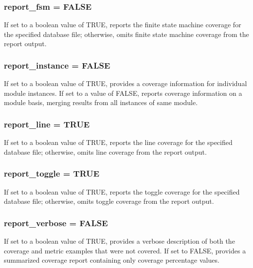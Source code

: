 \subsubsection{ report\_\-fsm = FALSE}\label{report_8c_a3}


If set to a boolean value of TRUE, reports the finite state machine coverage for the specified database file; otherwise, omits finite state machine coverage from the report output. 
\subsubsection{ report\_\-instance = FALSE}\label{report_8c_a5}


If set to a boolean value of TRUE, provides a coverage information for individual module instances. If set to a value of FALSE, reports coverage information on a module basis, merging results from all instances of same module. 
\subsubsection{ report\_\-line = TRUE}\label{report_8c_a0}


If set to a boolean value of TRUE, reports the line coverage for the specified database file; otherwise, omits line coverage from the report output. 
\subsubsection{ report\_\-toggle = TRUE}\label{report_8c_a1}


If set to a boolean value of TRUE, reports the toggle coverage for the specified database file; otherwise, omits toggle coverage from the report output. 
\subsubsection{ report\_\-verbose = FALSE}\label{report_8c_a4}


If set to a boolean value of TRUE, provides a verbose description of both the coverage and metric examples that were not covered. If set to FALSE, provides a summarized coverage report containing only coverage percentage values. 